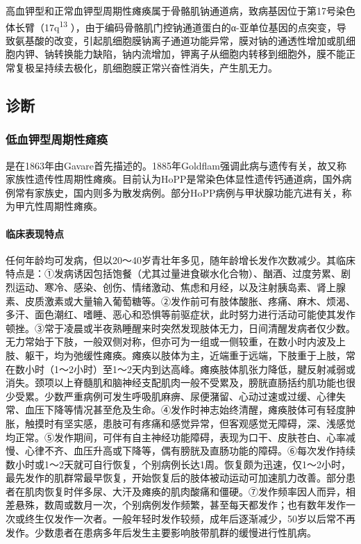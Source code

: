 高血钾型和正常血钾型周期性瘫痪属于骨骼肌钠通道病，致病基因位于第17号染色体长臂（17q\textsuperscript{13}
），由于编码骨骼肌门控钠通道蛋白的α-亚单位基因的点突变，导致氨基酸的改变，引起肌细胞膜钠离子通道功能异常，膜对钠的通透性增加或肌细胞内钾、钠转换能力缺陷，钠内流增加，钾离子从细胞内转移到细胞外，膜不能正常复极呈持续去极化，肌细胞膜正常兴奋性消失，产生肌无力。

\subsection{诊断}

\subsubsection{低血钾型周期性瘫痪}

是在1863年由Gavare首先描述的。1885年Goldflam强调此病与遗传有关，故又称家族性遗传性周期性瘫痪。目前认为HoPP是常染色体显性遗传钙通道病，国外病例常有家族史，国内则多为散发病例。部分HoPP病例与甲状腺功能亢进有关，称为甲亢性周期性瘫痪。

\paragraph{临床表现特点}

任何年龄均可发病，但以20～40岁青壮年多见，随年龄增长发作次数减少。其临床特点是：①发病诱因包括饱餐（尤其过量进食碳水化合物）、酗酒、过度劳累、剧烈运动、寒冷、感染、创伤、情绪激动、焦虑和月经，以及注射胰岛素、肾上腺素、皮质激素或大量输入葡萄糖等。②发作前可有肢体酸胀、疼痛、麻木、烦渴、多汗、面色潮红、嗜睡、恶心和恐惧等前驱症状，此时努力进行活动可能使其发作顿挫。③常于凌晨或半夜熟睡醒来时突然发现肢体无力，日间清醒发病者仅少数。无力常始于下肢，一般双侧对称，但亦可为一组或一侧较重，在数小时内波及上肢、躯干，均为弛缓性瘫痪。瘫痪以肢体为主，近端重于远端，下肢重于上肢，常在数小时（1～2小时）至1～2天内到达高峰。瘫痪肢体肌张力降低，腱反射减弱或消失。颈项以上脊髓肌和脑神经支配肌肉一般不受累及，膀胱直肠括约肌功能也很少受累。少数严重病例可发生呼吸肌麻痹、尿便潴留、心动过速或过缓、心律失常、血压下降等情况甚至危及生命。④发作时神志始终清醒，瘫痪肢体可有轻度肿胀，触摸时有坚实感，患肢可有疼痛和感觉异常，但客观感觉无障碍，深、浅感觉均正常。⑤发作期间，可伴有自主神经功能障碍，表现为口干、皮肤苍白、心率减慢、心律不齐、血压升高或下降等，偶有膀胱及直肠功能的障碍。⑥每次发作持续数小时或1～2天就可自行恢复，个别病例长达1周。恢复颇为迅速，仅1～2小时，最先发作的肌群常最早恢复，开始恢复后的肢体被动运动可加速肌力改善。部分患者在肌肉恢复时伴多尿、大汗及瘫痪的肌肉酸痛和僵硬。⑦发作频率因人而异，相差悬殊，数周或数月一次，个别病例发作频繁，甚至每天都发作；也有数年发作一次或终生仅发作一次者。一般年轻时发作较频，成年后逐渐减少，50岁以后常不再发作。少数患者在患病多年后发生主要影响肢带肌群的缓慢进行性肌病。

